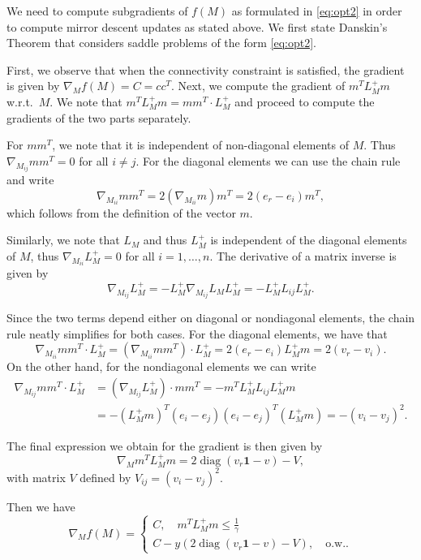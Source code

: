 \documentclass{article}
\begin{document}
We need to compute subgradients of $f(M)$ as formulated in \eqref{eq:opt2} in order to compute mirror descent updates as stated above. We first state Danskin's Theorem \cite{danskin} that considers saddle problems of the form \eqref{eq:opt2}.

First, we observe that when the connectivity constraint is satisfied, the gradient is given by $\nabla_M f(M) = C = c c^T$. Next, we compute the gradient of $m^T L_M^+ m$ w.r.t.~$M$. We note that $m^T L_M^+ m = m m^T \cdot L_M^+$ and proceed to compute the gradients of the two parts separately. 

For $m m^T$, we note that it is independent of non-diagonal elements of $M$. Thus $\nabla_{M_{ij}} m m^T = 0$ for all $i \neq j$. For the diagonal elements we can use the chain rule and write
\[ \nabla_{M_{ii}} m m^T = 2 (\nabla_{M_{ii}} m) m^T = 2 (e_r - e_i) m^T,\]
which follows from the definition of the vector $m$.

Similarly, we note that $L_M$ and thus $L_M^+$ is independent of the diagonal elements of $M$, thus $\nabla_{M_{ii}} L_M^+ = 0$ for all $i = 1,\ldots,n$. The derivative of a matrix inverse is given by
\[ \nabla_{M_{ij}} L_M^+ = - L_M^+ \nabla_{M_{ij}} L_M L_M^+ = - L_M^+ L_{ij} L_M^+. \]

Since the two terms depend either on diagonal or nondiagonal elements, the chain rule neatly simplifies for both cases. For the diagonal elements, we have that 
\[ \nabla_{M_{ii}} m m^T \cdot L_M^+ = \left(\nabla_{M_{ii}} m m^T\right) \cdot L_M^+ = 2 (e_r - e_i) L_M^+ m = 2(v_r - v_i). \]
On the other hand, for the nondiagonal elements we can write
\begin{align*}
  \nabla_{M_{ij}} m m^T \cdot L_M^+ & = \left(\nabla_{M_{ij}} L_M^+\right) \cdot m m^T = - m^T L_M^+ L_{ij} L_M^+ m \\
  & = -(L_M^+ m)^T (e_i - e_j) (e_i - e_j)^T (L_M^+ m) = -(v_i - v_j)^2.
\end{align*}

The final expression we obtain for the gradient is then given by
\[ \nabla_M m^T L_M^+ m = 2 \operatorname{diag}(v_r \bm{1} - v) - V, \]
with matrix $V$ defined by $V_{ij} = (v_i - v_j)^2$.

Then we have
\[ \nabla_M f(M) = \begin{cases}
     C, \quad m^T L_M^+ m \leq \frac{1}{\gamma} \\
     C - y \left( 2 \operatorname{diag}(v_r \bm{1} - v) - V \right), \quad \mathrm{ o.w.}.
\end{cases} 
\]
\end{document}
